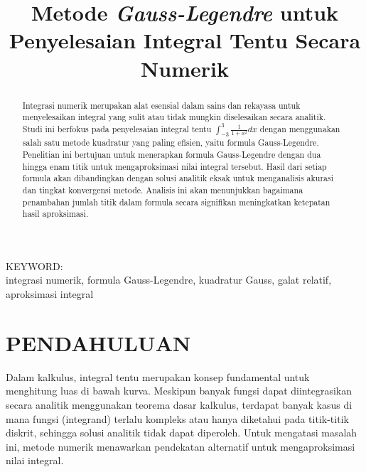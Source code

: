 \documentclass[conference]{IEEEtran}
\begin{document}
\title{\textbf{Metode \textit{Gauss-Legendre} untuk Penyelesaian Integral Tentu Secara Numerik}}

\author{
}

\maketitle

\begin{abstract}
Integrasi numerik merupakan alat esensial dalam sains dan rekayasa untuk menyelesaikan integral yang sulit atau tidak mungkin diselesaikan secara analitik. Studi ini berfokus pada penyelesaian integral tentu $\int_{-3}^{3} \frac{1}{1+x^2} dx$ dengan menggunakan salah satu metode kuadratur yang paling efisien, yaitu formula Gauss-Legendre. Penelitian ini bertujuan untuk menerapkan formula Gauss-Legendre dengan dua hingga enam titik untuk mengaproksimasi nilai integral tersebut. Hasil dari setiap formula akan dibandingkan dengan solusi analitik eksak untuk menganalisis akurasi dan tingkat konvergensi metode. Analisis ini akan menunjukkan bagaimana penambahan jumlah titik dalam formula secara signifikan meningkatkan ketepatan hasil aproksimasi.
\end{abstract}

\begin{IEEEkeywords}
KEYWORD: \\
integrasi numerik, formula Gauss-Legendre, kuadratur Gauss, galat relatif, aproksimasi integral
\end{IEEEkeywords}

\section{PENDAHULUAN}

Dalam kalkulus, integral tentu merupakan konsep fundamental untuk menghitung luas di bawah kurva. Meskipun banyak fungsi dapat diintegrasikan secara analitik menggunakan teorema dasar kalkulus, terdapat banyak kasus di mana fungsi (integrand) terlalu kompleks atau hanya diketahui pada titik-titik diskrit, sehingga solusi analitik tidak dapat diperoleh. Untuk mengatasi masalah ini, metode numerik menawarkan pendekatan alternatif untuk mengaproksimasi nilai integral.
\end{document}
